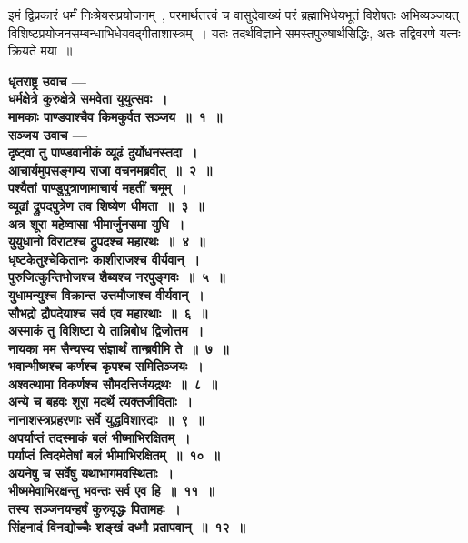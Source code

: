 इमं द्विप्रकारं धर्मं निःश्रेयसप्रयोजनम्~, परमार्थतत्त्वं च वासुदेवाख्यं परं ब्रह्माभिधेयभूतं विशेषतः अभिव्यञ्जयत् विशिष्टप्रयोजनसम्बन्धाभिधेयवद्गीताशास्त्रम्~। यतः तदर्थविज्ञाने समस्तपुरुषार्थसिद्धिः, अतः तद्विवरणे यत्नः क्रियते मया~॥\par

\begin{center}{\bfseries धृतराष्ट्र उवाच —\\ धर्मक्षेत्रे कुरुक्षेत्रे समवेता युयुत्सवः~।\\मामकाः पाण्डवाश्चैव किमकुर्वत सञ्जय~॥~१~॥}\\[10pt]
{\bfseries सञ्जय उवाच —}\\ 
{\bfseries दृष्ट्वा तु पाण्डवानीकं व्यूढं दुर्योधनस्तदा~।\\आचार्यमुपसङ्गम्य राजा वचनमब्रवीत्~॥~२~॥}\\[10pt]
{\bfseries पश्यैतां पाण्डुपुत्राणामाचार्य महतीं चमूम्~।\\व्यूढां द्रुपदपुत्रेण तव शिष्येण धीमता~॥~३~॥}\\[10pt]
{\bfseries अत्र शूरा महेष्वासा भीमार्जुनसमा युधि~।\\युयुधानो विराटश्च द्रुपदश्च महारथः~॥~४~॥}\\[10pt]
{\bfseries धृष्टकेतुश्चेकितानः काशीराजश्च वीर्यवान्~।\\पुरुजित्कुन्तिभोजश्च शैब्यश्च नरपुङ्गवः~॥~५~॥}\\[10pt]
{\bfseries युधामन्युश्च विक्रान्त उत्तमौजाश्च वीर्यवान्~।\\सौभद्रो द्रौपदेयाश्च सर्व एव महारथाः~॥~६~॥}\\[10pt]
{\bfseries अस्माकं तु विशिष्टा ये तान्निबोध द्विजोत्तम~।\\नायका मम सैन्यस्य संज्ञार्थं तान्ब्रवीमि ते~॥~७~॥}\\[10pt]
{\bfseries भवान्भीष्मश्च कर्णश्च कृपश्च समितिञ्जयः~।\\अश्वत्थामा विकर्णश्च सौमदत्तिर्जयद्रथः~॥~८~॥}\\[10pt]
{\bfseries अन्ये च बहवः शूरा मदर्थे त्यक्तजीविताः~।\\नानाशस्त्रप्रहरणाः सर्वे युद्धविशारदाः~॥~९~॥}\\[10pt]
{\bfseries अपर्याप्तं तदस्माकं बलं भीष्माभिरक्षितम्~।\\पर्याप्तं त्विदमेतेषां बलं भीमाभिरक्षितम्~॥~१०~॥}\\[10pt]
{\bfseries अयनेषु च सर्वेषु यथाभागमवस्थिताः~।\\भीष्ममेवाभिरक्षन्तु भवन्तः सर्व एव हि~॥~११~॥}\\[10pt]
{\bfseries तस्य सञ्जनयन्हर्षं कुरुवृद्धः पितामहः~।\\सिंहनादं विनद्योच्चैः शङ्खं दध्मौ प्रतापवान्~॥~१२~॥}\\[10pt]

\end{center}
